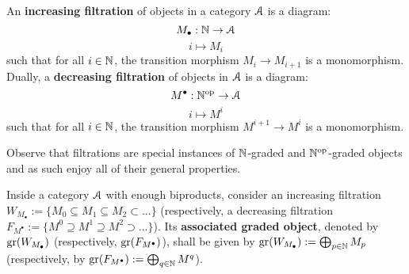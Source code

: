             \begin{definition}[Filtrations] \label{def: filtrations}
                An \textbf{increasing filtration} of objects in a category $\mathcal{A}$ is a diagram:
                    $$M_{\bullet}: \mathbb{N} \to \mathcal{A}$$
                    $$i \mapsto M_i$$
                such that for all $i \in \mathbb{N}$, the transition morphism $M_i \to M_{i + 1}$ is a monomorphism. Dually, a \textbf{decreasing filtration} of objects in $\mathcal{A}$ is a diagram:
                    $$M^{\bullet}: \mathbb{N}^{\mathrm{op}} \to \mathcal{A}$$
                    $$i \mapsto M^i$$
                such that for all $i \in \mathbb{N}$, the transition morphism $M^{i + 1} \to M^i$ is a monomorphism.
            \end{definition}
            \begin{remark}
                Observe that filtrations are special instances of $\mathbb{N}$-graded and $\mathbb{N}^{\mathrm{op}}$-graded objects and as such enjoy all of their general properties.
            \end{remark}
            \begin{definition} \label{def: associated_graded_objects}
                Inside a category $\mathcal{A}$ with enough biproducts, consider an increasing filtration $W_{M_{\bullet}} := \{M_0 \subseteq M_1 \subseteq M_2 \subset ...\}$ (respectively, a decreasing filtration $F_{M^{\bullet}} := \{M^0 \supseteq M^1 \supseteq M^2 \supset ...\}$). Its \textbf{associated graded object}, denoted by $\operatorname{gr}(W_{M_{\bullet}})$ (respectively, $\operatorname{gr}(F_{M^{\bullet}})$), shall be given by $\operatorname{gr}(W_{M_{\bullet}}) := \bigoplus_{p \in \mathbb{N}} M_p$ (respectively, by $\operatorname{gr}(F_{M^{\bullet}}) := \bigoplus_{q \in \mathbb{N}} M^q$).
            \end{definition}
        
